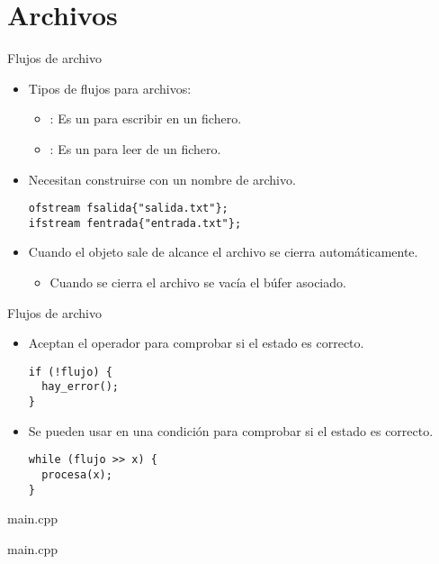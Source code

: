 \section{Archivos}

\begin{frame}[t,fragile]{Flujos de archivo}
\begin{itemize}
  \item Tipos de flujos para archivos:
    \begin{itemize}
      \item {}: Es un  para escribir en un fichero.
      \item {}: Es un  para leer de un fichero.
    \end{itemize}
  \vfill

  \item Necesitan construirse con un nombre de archivo.
\begin{lstlisting}
ofstream fsalida{"salida.txt"};
ifstream fentrada{"entrada.txt"};
\end{lstlisting}
  \vfill

  \item Cuando el objeto sale de alcance el archivo se cierra automáticamente.
    \begin{itemize}
      \item Cuando se cierra el archivo se vacía el búfer asociado.
    \end{itemize}
\end{itemize}
\end{frame}

\begin{frame}[t,fragile]{Flujos de archivo}
\begin{itemize}
  \item Aceptan el operador \cppkey{!} para comprobar si el estado es correcto.
\begin{lstlisting}
if (!flujo) { 
  hay_error(); 
}
\end{lstlisting}
  \item Se pueden usar en una condición para comprobar si el estado es correcto.
\begin{lstlisting}
while (flujo >> x) { 
  procesa(x); 
}
\end{lstlisting}
\end{itemize}
\end{frame}

 {

\begin{frame}[t]
\begin{block}{main.cpp}

\end{block}
\end{frame}

\begin{frame}[t]
\begin{block}{main.cpp}

\end{block}
\end{frame}

}

